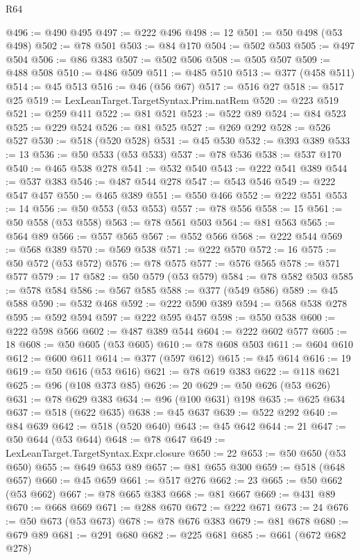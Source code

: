 \begin{lexlean}{R64}
\begin{coremodule}
@496 := @490 @495
@497 := @222 @496
@498 := 12
@501 := @50 @498 (@53 @498)
@502 := @78 @501
@503 := @84 @170
@504 := @502 @503
@505 := @497 @504
@506 := @86 @383
@507 := @502 @506
@508 := @505 @507
@509 := @488 @508
@510 := @486 @509
@511 := @485 @510
@513 := @377 (@458 @511)
@514 := @45 @513
@516 := @46 (@56 @67)
@517 := @516 @27
@518 := @517 @25
@519 := LexLeanTarget.TargetSyntax.Prim.natRem
@520 := @223 @519
@521 := @259 @411
@522 := @81 @521
@523 := @522 @89
@524 := @84 @523
@525 := @229 @524
@526 := @81 @525
@527 := @269 @292
@528 := @526 @527
@530 := @518 (@520 @528)
@531 := @45 @530
@532 := @393 @389
@533 := 13
@536 := @50 @533 (@53 @533)
@537 := @78 @536
@538 := @537 @170
@540 := @465 @538 @278
@541 := @532 @540
@543 := @222 @541 @389
@544 := @537 @383
@546 := @487 @544 @278
@547 := @543 @546
@549 := @222 @547 @457
@550 := @465 @389
@551 := @550 @466
@552 := @222 @551
@553 := 14
@556 := @50 @553 (@53 @553)
@557 := @78 @556
@558 := 15
@561 := @50 @558 (@53 @558)
@563 := @78 @561 @503
@564 := @81 @563
@565 := @564 @89
@566 := @557 @565
@567 := @552 @566
@568 := @222 @544
@569 := @568 @389
@570 := @569 @538
@571 := @222 @570
@572 := 16
@575 := @50 @572 (@53 @572)
@576 := @78 @575
@577 := @576 @565
@578 := @571 @577
@579 := 17
@582 := @50 @579 (@53 @579)
@584 := @78 @582 @503
@585 := @578 @584
@586 := @567 @585
@588 := @377 (@549 @586)
@589 := @45 @588
@590 := @532 @468
@592 := @222 @590 @389
@594 := @568 @538 @278
@595 := @592 @594
@597 := @222 @595 @457
@598 := @550 @538
@600 := @222 @598 @566
@602 := @487 @389 @544
@604 := @222 @602 @577
@605 := 18
@608 := @50 @605 (@53 @605)
@610 := @78 @608 @503
@611 := @604 @610
@612 := @600 @611
@614 := @377 (@597 @612)
@615 := @45 @614
@616 := 19
@619 := @50 @616 (@53 @616)
@621 := @78 @619 @383
@622 := @118 @621
@625 := @96 (@108 @373 @85)
@626 := 20
@629 := @50 @626 (@53 @626)
@631 := @78 @629 @383
@634 := @96 (@100 @631) @198
@635 := @625 @634
@637 := @518 (@622 @635)
@638 := @45 @637
@639 := @522 @292
@640 := @84 @639
@642 := @518 (@520 @640)
@643 := @45 @642
@644 := 21
@647 := @50 @644 (@53 @644)
@648 := @78 @647
@649 := LexLeanTarget.TargetSyntax.Expr.closure
@650 := 22
@653 := @50 @650 (@53 @650)
@655 := @649 @653 @89
@657 := @81 @655 @300
@659 := @518 (@648 @657)
@660 := @45 @659
@661 := @517 @276
@662 := 23
@665 := @50 @662 (@53 @662)
@667 := @78 @665 @383
@668 := @81 @667
@669 := @431 @89
@670 := @668 @669
@671 := @288 @670
@672 := @222 @671
@673 := 24
@676 := @50 @673 (@53 @673)
@678 := @78 @676 @383
@679 := @81 @678
@680 := @679 @89
@681 := @291 @680
@682 := @225 @681
@685 := @661 (@672 @682 @278)

\end{coremodule}
\end{lexlean}
